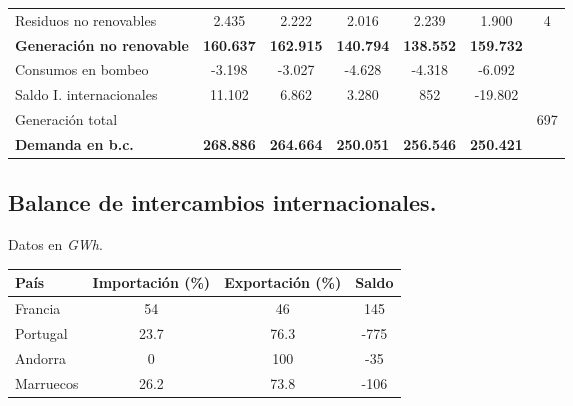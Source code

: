 \begin{table}[htbp]
\begin{tabular}{l|cccccc}
					Residuos no renovables &  2.435 &  2.222 &   2.016 &   2.239 &   1.900 & 4\\
					\textbf{Generación no renovable} & \textbf{160.637} & \textbf{162.915} & \textbf{140.794} & \textbf{138.552} & \textbf{159.732} & \\
					Consumos en bombeo    &  -3.198 & -3.027 &  -4.628 &  -4.318 &  -6.092 & \\
					Saldo I. internacionales & 11.102 &  6.862 &   3.280 &   852   & -19.802 & \\
					Generación total	  &&&&&&697\\
					\hline
					\textbf{Demanda en b.c.}       & \textbf{268.886} & \textbf{264.664} & \textbf{250.051} & \textbf{256.546} & \textbf{250.421} &\\
				\end{tabular}
			\end{table}

		\subsection{Balance de intercambios internacionales.}
			Datos en \textit{GWh}.
			\begin{table}[htbp]
				\centering
				\begin{tabular}{lccc}
					\toprule
					\textbf{País} & \textbf{Importación (\%)} & \textbf{Exportación (\%)} & \textbf{Saldo} \\
					\midrule
					Francia & 54 & 46 & 145 \\
					Portugal & 23.7 & 76.3 & -775 \\
					Andorra & 0 & 100 & -35 \\
					Marruecos & 26.2 & 73.8 & -106 \\
					\bottomrule
				\end{tabular}
			\end{table}
			

